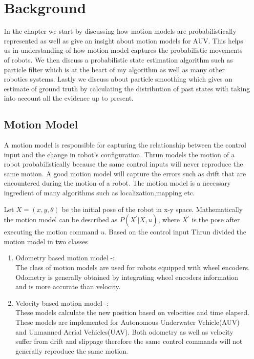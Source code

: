 \documentclass[12pt]{dalcsthesis}
\begin{document}
\chapter{Background}
In the chapter we start by discussing how motion models are probabilistically represented as well as give an insight about motion models for AUV. This helps us in understanding of how motion model captures the probabilistic movements of robots. We then discuss a probabilistic state estimation algorithm such as particle filter \cite{ristic2004beyond} \cite{chen2003bayesian} which is at the heart of my algorithm as well as many other robotics systems. Lastly we discuss about particle smoothing \cite{doucet2000monte} \cite{doucet2009tutorial} which gives an estimate of ground truth by calculating the distribution of past states with taking into account all the evidence up to present. 

\section{Motion Model}
\label{chap-:Motion Model}
A motion model is responsible for capturing the relationship between the control input and the change in robot's configuration. Thrun \cite{thrun2005probabilistic} models the motion of a robot probabilistically because the same
control inputs will never reproduce the same motion. A good motion model will capture the errors such as drift that are encountered during the motion of a robot. The motion model is a necessary ingredient of many algorithms such as localization,mapping etc. 

Let $X=(x,y,\theta)$ be the initial pose of the robot in x-y space. Mathematically the motion model can be described as $P(X^{'}|X,u)$, where $X^{'}$ is the pose after executing the motion command $u$. Based on the control input Thrun \cite{thrun2005probabilistic} divided the motion model in two classes
\begin{enumerate}
\item Odometry based motion model -: \\
The class of motion models are used for robots equipped with wheel encoders. Odometry is generally obtained by integrating wheel encoders information and is more accurate than velocity.  

\item Velocity based motion model -: \\
These models calculate the new position based on velocities and time elapsed. These models are implemented for Autonomous Underwater Vehicle(AUV) and Unmanned Aerial Vehicles(UAV). Both odometry as well as velocity suffer from drift and slippage therefore the same control commands will not generally reproduce the same motion.
\end{enumerate}
\end{document}
